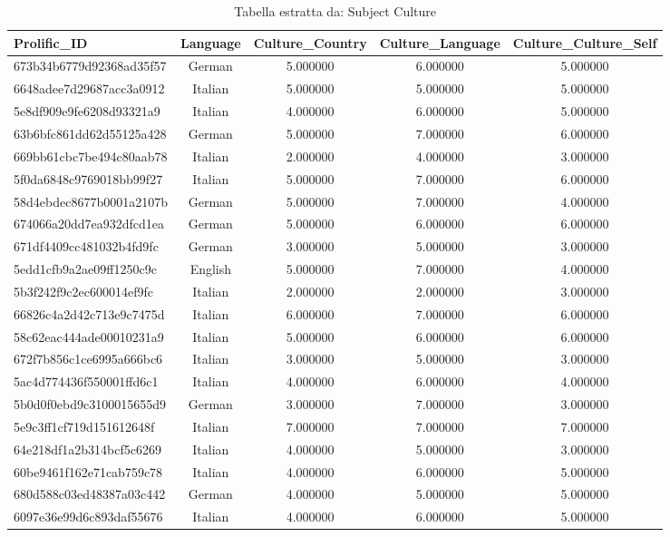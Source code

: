 \begin{table}[htbp]
\caption{Tabella estratta da: Subject Culture}
\label{tab:subject culture}
\begin{tabular}{lcccc}
\toprule
Prolific\_ID & Language & Culture\_Country & Culture\_Language & Culture\_Culture\_Self \\
\midrule
673b34b6779d92368ad35f57 & German & 5.000000 & 6.000000 & 5.000000 \\
6648adee7d29687acc3a0912 & Italian & 5.000000 & 5.000000 & 5.000000 \\
5e8df909e9fe6208d93321a9 & Italian & 4.000000 & 6.000000 & 5.000000 \\
63b6bfc861dd62d55125a428 & German & 5.000000 & 7.000000 & 6.000000 \\
669bb61cbc7be494c80aab78 & Italian & 2.000000 & 4.000000 & 3.000000 \\
5f0da6848c9769018bb99f27 & Italian & 5.000000 & 7.000000 & 6.000000 \\
58d4ebdec8677b0001a2107b & German & 5.000000 & 7.000000 & 4.000000 \\
674066a20dd7ea932dfcd1ea & German & 5.000000 & 6.000000 & 6.000000 \\
671df4409cc481032b4fd9fc & German & 3.000000 & 5.000000 & 3.000000 \\
5edd1cfb9a2ae09ff1250c9c & English & 5.000000 & 7.000000 & 4.000000 \\
5b3f242f9c2ec600014ef9fc & Italian & 2.000000 & 2.000000 & 3.000000 \\
66826c4a2d42c713e9c7475d & Italian & 6.000000 & 7.000000 & 6.000000 \\
58c62eac444ade00010231a9 & Italian & 5.000000 & 6.000000 & 6.000000 \\
672f7b856c1ce6995a666bc6 & Italian & 3.000000 & 5.000000 & 3.000000 \\
5ac4d774436f550001ffd6c1 & Italian & 4.000000 & 6.000000 & 4.000000 \\
5b0d0f0ebd9c3100015655d9 & German & 3.000000 & 7.000000 & 3.000000 \\
5e9c3ff1cf719d151612648f & Italian & 7.000000 & 7.000000 & 7.000000 \\
64e218df1a2b314bcf5c6269 & Italian & 4.000000 & 5.000000 & 3.000000 \\
60be9461f162e71cab759c78 & Italian & 4.000000 & 6.000000 & 5.000000 \\
680d588c03ed48387a03c442 & German & 4.000000 & 5.000000 & 5.000000 \\
6097e36e99d6c893daf55676 & Italian & 4.000000 & 6.000000 & 5.000000 \\

\end{tabular}
\end{table}
